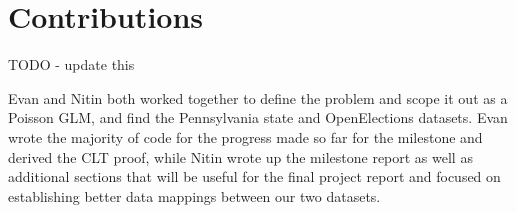 \documentclass[10pt, letterpaper]{article}
\begin{document}
\section{Contributions}
TODO - update this

Evan and Nitin both worked together to define the problem and scope it out as a Poisson GLM, and find the Pennsylvania state and OpenElections datasets. Evan wrote the majority of code for the progress made so far for the milestone and derived the CLT proof, while Nitin wrote up the milestone report as well as additional sections that will be useful for the final project report and focused on establishing better data mappings between our two datasets.

{\small


}
\end{document}
